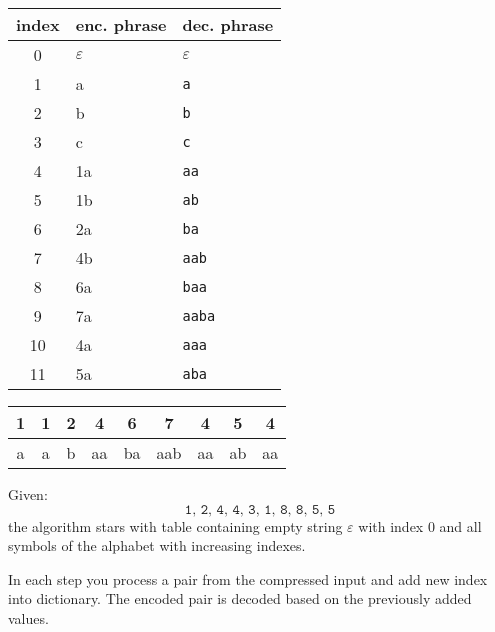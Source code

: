 \begin{figure*}
  \begin{center}
  \begin{tabular}{c|l|l}
    index & enc. phrase & dec. phrase \\
    \hline
    0 & $\varepsilon$ & $\varepsilon$\\
    1 & a & \texttt{a}\\
    2 & b & \texttt{b}\\
    3 & c & \texttt{c}\\
    4 & 1a & \texttt{aa}\\
    5 & 1b & \texttt{ab}\\
    6 & 2a & \texttt{ba}\\
    7 & 4b & \texttt{aab}\\
    8 & 6a & \texttt{baa}\\
    9 & 7a & \texttt{aaba}\\
    10 & 4a & \texttt{aaa}\\
    11 & 5a & \texttt{aba}\\
  \end{tabular}
  \begin{tabular}{|c|c|c|c|c|c|c|c|c|}
    \hline
    1 & 1 & 2 & 4 & 6 & 7 & 4 & 5 & 4\\
    \hline
    a & a & b & aa & ba & aab & aa & ab & aa\\
    \hline
  \end{tabular}
  \end{center}
  \caption{$LZWW^R(LWZ(\text{aabaabaaabaaabaa}))$}
\end{figure*}

Given: $$ \texttt{1, 2, 4, 4, 3, 1, 8, 8, 5, 5}$$
the algorithm stars with table containing empty string $\varepsilon$ with index $0$ and all symbols of the alphabet with increasing indexes.

In each step you process a pair from the compressed input and add new index into dictionary. The encoded pair is decoded based on the previously added values.

